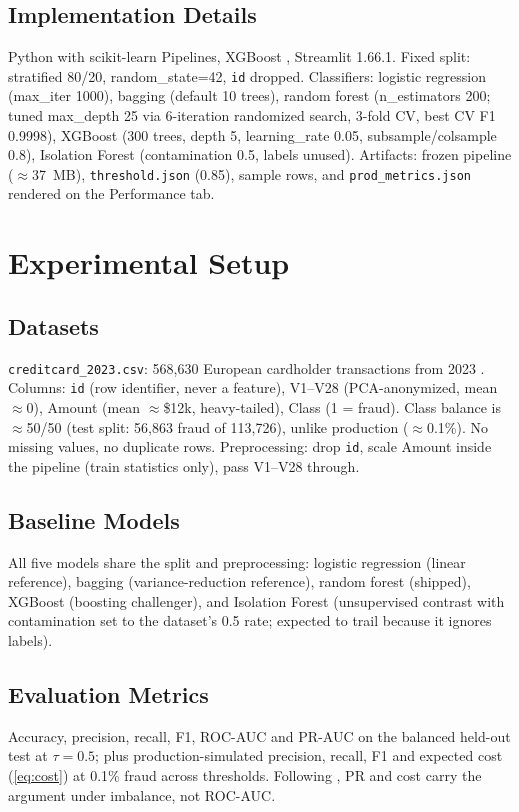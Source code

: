 \documentclass[conference]{IEEEtran}
\begin{document}
\subsection{Implementation Details}
Python with scikit-learn \cite{sklearn2011} Pipelines, XGBoost
\cite{xgboost2016}, Streamlit 1.66.1. Fixed split: stratified 80/20,
random\_state=42, \texttt{id} dropped. Classifiers: logistic
regression (max\_iter 1000), bagging (default 10 trees), random forest
(n\_estimators 200; tuned max\_depth 25 via 6-iteration randomized
search, 3-fold CV, best CV F1 0.9998), XGBoost (300 trees, depth 5,
learning\_rate 0.05, subsample/colsample 0.8), Isolation Forest
(contamination 0.5, labels unused). Artifacts: frozen pipeline
($\approx$37~MB), \texttt{threshold.json} (0.85), sample rows, and
\texttt{prod\_metrics.json} rendered on the Performance tab.

\section{Experimental Setup}
\subsection{Datasets}
\texttt{creditcard\_2023.csv}: 568,630 European cardholder
transactions from 2023 \cite{kaggle2023}. Columns: \texttt{id} (row
identifier, never a feature), V1--V28 (PCA-anonymized, mean
$\approx$0), Amount (mean $\approx$\$12k, heavy-tailed), Class (1 =
fraud). Class balance is $\approx$50/50 (test split: 56,863 fraud of
113,726), unlike production ($\approx$0.1\%). No missing values, no
duplicate rows. Preprocessing: drop \texttt{id}, scale Amount inside
the pipeline (train statistics only), pass V1--V28 through.

\subsection{Baseline Models}
All five models share the split and preprocessing: logistic
regression (linear reference), bagging (variance-reduction
reference), random forest (shipped), XGBoost (boosting challenger),
and Isolation Forest (unsupervised contrast with contamination set to
the dataset's 0.5 rate; expected to trail because it ignores labels).

\subsection{Evaluation Metrics}
Accuracy, precision, recall, F1, ROC-AUC and PR-AUC on the balanced
held-out test at $\tau=0.5$; plus production-simulated precision,
recall, F1 and expected cost (\ref{eq:cost}) at 0.1\% fraud across
thresholds. Following \cite{saito2015}, PR and cost carry the
argument under imbalance, not ROC-AUC.
\end{document}
